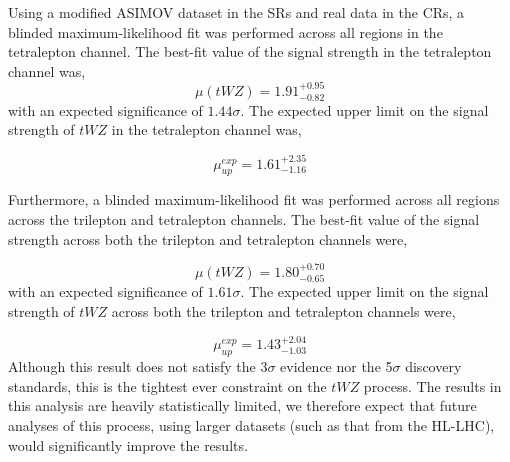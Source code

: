 Using a modified ASIMOV dataset in the SRs and real data in the CRs, a blinded maximum-likelihood fit was performed across all regions in the tetralepton channel. The best-fit value of the signal strength in the tetralepton channel was,
\begin{equation}
  \mu (tWZ) =   1.91^{+0.95}_{-0.82}
\end{equation}
with an expected significance of $1.44\sigma$. The expected upper limit on the signal strength of $tWZ$ in the tetralepton channel was,

\begin{equation}
  \mu_{up}^{exp} =   1.61^{+2.35}_{-1.16}
\end{equation}

Furthermore, a blinded maximum-likelihood fit was performed across all regions across the trilepton and tetralepton channels. The best-fit value of the signal strength across both the trilepton and tetralepton channels were,

\begin{equation}
  \mu (tWZ) =   1.80^{+0.70}_{-0.65}
\end{equation}
with an expected significance of $1.61\sigma$. The expected upper limit on the signal strength of $tWZ$ across both the trilepton and tetralepton channels were,

\begin{equation}
  \mu_{up}^{exp} =   1.43^{+2.04}_{-1.03}
\end{equation}
 Although this result does not satisfy the 3$\sigma$ evidence nor the 5$\sigma$ discovery standards, this is the tightest ever constraint on the $tWZ$ process. The results in this analysis are heavily statistically limited, we therefore expect that future analyses of this process, using larger datasets (such as that from the HL-LHC), would significantly improve the results.











